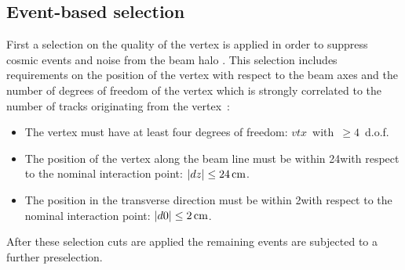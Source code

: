 \subsection{Event-based selection}
\label{sec:EventBasedSelection}
First a selection on the quality of the vertex is applied in order to suppress cosmic events and noise from the beam halo .
This selection includes requirements on the position of the vertex with respect to the beam axes and the number of degrees of freedom of the vertex which is strongly correlated to the number of tracks originating from the vertex~\cite{bib:CMS:Tracking_7TeV_PAS}:  
\begin{itemize}
\renewcommand{\labelitemi}{\footnotesize{\ding{118}}}
\item The vertex must have at least four degrees of freedom: \mbox{$vtx$ with $\geq 4$ d.o.f.}
\item The position of the vertex along the beam line must be within 24\cm with respect to the nominal interaction point: \mbox{$|dz| \leq 24\,\text{cm}$.}
\item The position in the transverse direction must be within 2\cm with respect to the nominal interaction point: \mbox{$|d0| \leq 2\,\text{cm}$.}
\end{itemize}
After these selection cuts are applied the remaining events are subjected to a further preselection.\\

